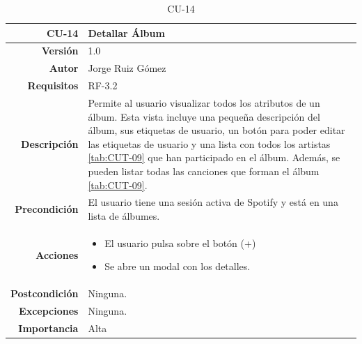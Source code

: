 \begin{table}[H]
    \centering
    \begin{tabular}{r|p{}}
    \hline
    \textbf{CU-14}  & \textbf{Detallar Álbum}                                 \\ \hline
    \textbf{Versión}       & 1.0                                                     \\
    \textbf{Autor}         & Jorge Ruiz Gómez                                        \\
    \textbf{Requisitos}    & RF-3.2                                         \\
    \textbf{Descripción}   & Permite al usuario visualizar todos los atributos de un álbum. Esta vista incluye una pequeña descripción del álbum, sus etiquetas de usuario, un botón para poder editar las etiquetas de usuario y una lista con todos los artistas \ref{tab:CUT-09} que han participado en el álbum. Además, se pueden listar todas las canciones que forman el álbum \ref{tab:CUT-09}.
    \\ \hline
    \textbf{Precondición}  & El usuario tiene una sesión activa de Spotify y está en una lista de álbumes.\\
    \textbf{Acciones}      &    \begin{itemize}
                                    \item El usuario pulsa sobre el botón (+)
                                    \item Se abre un modal con los detalles.
                                \end{itemize}\\
                                                                              
    \textbf{Postcondición} & Ninguna. \\
    \textbf{Excepciones}   & Ninguna.    \\
    \textbf{Importancia}   & Alta        \\ \hline
    \end{tabular}
    \caption{CU-14}
    \label{tab:CUT-14}
\end{table}

